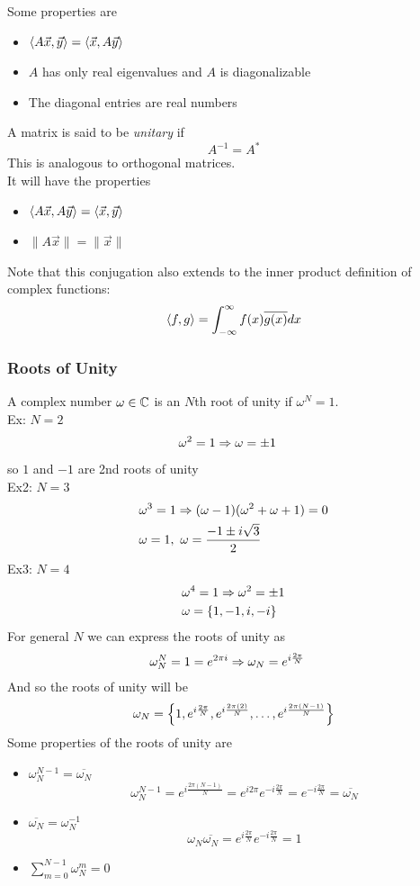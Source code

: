 \documentclass[11pt, fleqn]{article}
\begin{document}
Some properties are
\begin{itemize}
    \item $\left\langle A\vec{x},\vec{y} \right\rangle=\left\langle \vec{x},A\vec{y} \right\rangle$
    \item $A$ has only real eigenvalues and $A$ is diagonalizable
    \item The diagonal entries are real numbers
\end{itemize}
A matrix is said to be \textit{unitary} if
$$\boxed{A^{-1}=A^*}$$
This is analogous to orthogonal matrices.\\
It will have the properties
\begin{itemize}
    \item $\left\langle A\vec{x},A\vec{y} \right\rangle=\left\langle \vec{x},\vec{y} \right\rangle$
    \item $\|A\vec{x}\|=\|\vec{x}\|$
\end{itemize}
Note that this conjugation also extends to the inner product definition of complex functions:
$$\left\langle f,g \right\rangle=\int_{-\infty}^\infty f(x)\overline{g(x)}dx$$

\subsubsection{Roots of Unity}
A complex number $\omega\in\mathbb{C}$ is an $N$th root of unity if $\omega^N=1$.\\
Ex: $N=2$
\begin{align*}
    &\omega^2=1\Rightarrow \omega=\pm1
\end{align*}
so $1$ and $-1$ are 2nd roots of unity\\
Ex2: $N=3$
\begin{align*}
    &\omega^3=1\Rightarrow (\omega-1)(\omega^2+\omega+1)=0\\
    &\omega=1,\ \omega=\frac{-1\pm i\sqrt{3}}{2}
\end{align*}
Ex3: $N=4$
\begin{align*}
    &\omega^4=1\Rightarrow \omega^2=\pm1\\
    &\omega=\left\{ 1,-1,i,-i \right\}
\end{align*}
For general $N$ we can express the roots of unity as
\begin{align*}
    &\omega_N^N=1=e^{2\pi i}\Rightarrow \omega_N=e^{i\frac{2\pi}{N}}
\end{align*}
And so the roots of unity will be
$$\omega_N=\left\{ 1,e^{i\frac{2\pi}{N}},e^{i\frac{2\pi(2)}{N}},\ldots,e^{i\frac{2\pi(N-1)}{N}} \right\}$$
Some properties of the roots of unity are
\begin{itemize}
    \item $\omega_N^{N-1}=\overline{\omega_N}$
    \[ \omega_N^{N-1}=e^{i\frac{2\pi(N-1)}{N}}=e^{i2\pi}e^{-i\frac{2\pi}{N}}=e^{-i\frac{2\pi}{N}}=\overline{\omega_N} \]
    \item $\overline{\omega_N}=\omega_N^{-1}$
    \[ \omega_N\overline{\omega_N}=e^{i\frac{2\pi}{N}}e^{-i\frac{2\pi}{N}}=1 \]
    \item $\sum\limits_{m=0}^{N-1}\omega_N^m=0$
\end{itemize}
\end{document}
